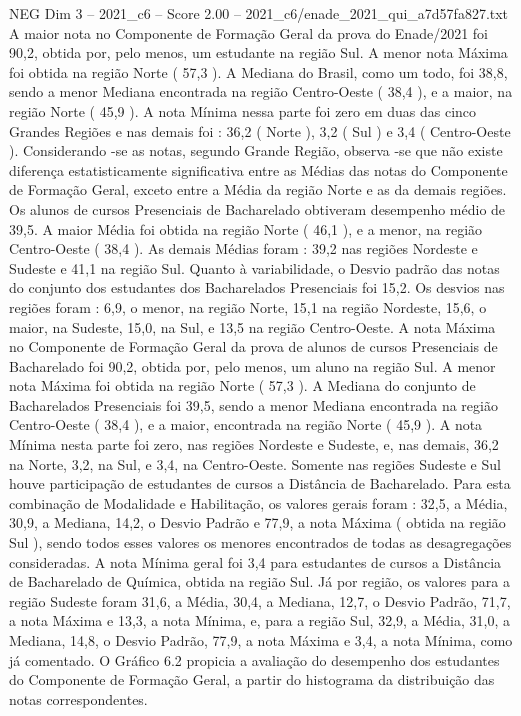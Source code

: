 \begin{textsample}{NEG Dim 3 – 2021\_c6 – Score 2.00 – 2021\_c6/enade\_2021\_qui\_a7d57fa827.txt}
A maior nota no Componente de Formação Geral da prova do Enade/2021 foi 90,2, obtida por, pelo menos, um estudante na região Sul.
A menor nota Máxima foi obtida na região Norte ( 57,3 ).
A Mediana do Brasil, como um todo, foi 38,8, sendo a menor Mediana encontrada na região Centro-Oeste ( 38,4 ), e a maior, na região Norte ( 45,9 ).
A nota Mínima nessa parte foi zero em duas das cinco Grandes Regiões e nas demais foi : 36,2 ( Norte ), 3,2 ( Sul ) e 3,4 ( Centro-Oeste ).
Considerando -se as notas, segundo Grande Região, observa -se que não existe diferença estatisticamente significativa entre as Médias das notas do Componente de Formação Geral, exceto entre a Média da região Norte e as da demais regiões.
Os alunos de cursos Presenciais de Bacharelado obtiveram desempenho médio de 39,5.
A maior Média foi obtida na região Norte ( 46,1 ), e a menor, na região Centro-Oeste ( 38,4 ).
As demais Médias foram : 39,2 nas regiões Nordeste e Sudeste e 41,1 na região Sul.
Quanto à variabilidade, o Desvio padrão das notas do conjunto dos estudantes dos Bacharelados Presenciais foi 15,2.
Os desvios nas regiões foram : 6,9, o menor, na região Norte, 15,1 na região Nordeste, 15,6, o maior, na Sudeste, 15,0, na Sul, e 13,5 na região Centro-Oeste.
A nota Máxima no Componente de Formação Geral da prova de alunos de cursos Presenciais de Bacharelado foi 90,2, obtida por, pelo menos, um aluno na região Sul.
A menor nota Máxima foi obtida na região Norte ( 57,3 ).
A Mediana do conjunto de Bacharelados Presenciais foi 39,5, sendo a menor Mediana encontrada na região Centro-Oeste ( 38,4 ), e a maior, encontrada na região Norte ( 45,9 ).
A nota Mínima nesta parte foi zero, nas regiões Nordeste e Sudeste, e, nas demais, 36,2 na Norte, 3,2, na Sul, e 3,4, na Centro-Oeste.
Somente nas regiões Sudeste e Sul houve participação de estudantes de cursos a Distância de Bacharelado.
Para esta combinação de Modalidade e Habilitação, os valores gerais foram : 32,5, a Média, 30,9, a Mediana, 14,2, o Desvio Padrão e 77,9, a nota Máxima ( obtida na região Sul ), sendo todos esses valores os menores encontrados de todas as desagregações consideradas.
A nota Mínima geral foi 3,4 para estudantes de cursos a Distância de Bacharelado de Química, obtida na região Sul.
Já por região, os valores para a região Sudeste foram 31,6, a Média, 30,4, a Mediana, 12,7, o Desvio Padrão, 71,7, a nota Máxima e 13,3, a nota Mínima, e, para a região Sul, 32,9, a Média, 31,0, a Mediana, 14,8, o Desvio Padrão, 77,9, a nota Máxima e 3,4, a nota Mínima, como já comentado.
O Gráfico 6.2 propicia a avaliação do desempenho dos estudantes do Componente de Formação Geral, a partir do histograma da distribuição das notas correspondentes.

\end{textsample}
